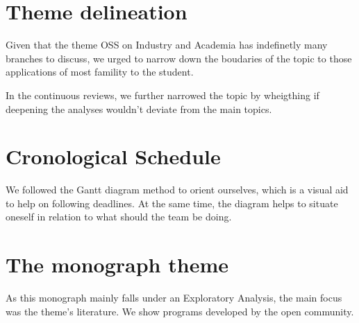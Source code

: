 \documentclass[
12pt,				%
openright,			%
oneside,			%
a4paper,			%
brazil,				%
english,			  %
]{abntex2}
\begin{document}
\section{Theme delineation}
Given that the theme OSS on Industry and Academia has indefinetly many
branches to discuss, we urged to narrow down the boudaries of the
topic to those applications of most famility to the student.

In the continuous reviews, we further narrowed the topic by wheigthing
if deepening the analyses wouldn't deviate from the main topics.

\section{Cronological Schedule}

We followed the Gantt diagram method to orient ourselves, which is a
visual aid to help on following deadlines. At the same time, the
diagram helps to situate oneself in relation to what should the team
be doing.

\section{The monograph theme}

As this monograph mainly falls under an Exploratory Analysis, the main
focus was the theme's literature. We show programs developed by the
open community. 

\end{document}
